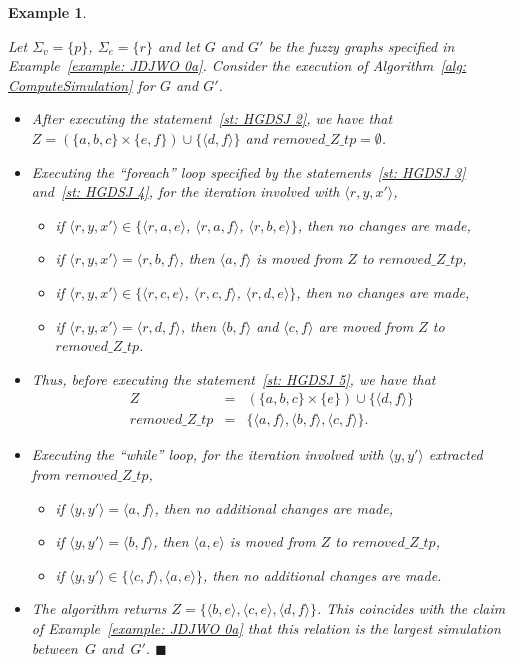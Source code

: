 \documentclass[11pt]{article}
\def\tuple#1{\langle#1\rangle}
\newcommand{\myend}{\mbox{}\hfill{\footnotesize$\blacksquare$}}
\newcommand{\SV}{\Sigma_v}
\newcommand{\SE}{\Sigma_e}
\newcommand{\removeZ}{\textit{removed\_Z\_tp}}
\newtheorem{Example}[theorem]{Example}
\newenvironment{example}{\begin{Example}\begin{em}}{\end{em}\end{Example}}
\begin{document}
\begin{example}\label{example: JDJWO}
Let $\SV = \{p\}$, $\SE = \{r\}$ and let $G$ and $G'$ be the fuzzy graphs specified in Example~\ref{example: JDJWO 0a}.
%
Consider the execution of Algorithm~\ref{alg: ComputeSimulation} for $G$ and $G'$.  
	\begin{itemize}
		\item After executing the statement~\ref{st: HGDSJ 2}, we have that $Z = (\{a,b,c\} \times \{e,f\}) \cup \{\tuple{d,f}\}$ and $\removeZ = \emptyset$.
		\item Executing the ``foreach'' loop specified by the statements~\ref{st: HGDSJ 3} and~\ref{st: HGDSJ 4}, for the iteration involved with $\tuple{r,y,x'}$, 
		\begin{itemize}
			\item if $\tuple{r,y,x'} \in \{\tuple{r,a,e}$, $\tuple{r,a,f}$, $\tuple{r,b,e}\}$, then no changes are made, 
			\item if $\tuple{r,y,x'} = \tuple{r,b,f}$, then $\tuple{a,f}$ is moved from $Z$ to $\removeZ$, 
			\item if $\tuple{r,y,x'} \in \{\tuple{r,c,e}$, $\tuple{r,c,f}$, $\tuple{r,d,e}\}$, then no changes are made, 
			\item if $\tuple{r,y,x'} = \tuple{r,d,f}$, then $\tuple{b,f}$ and $\tuple{c,f}$ are moved from $Z$ to $\removeZ$.   
		\end{itemize}
		\item Thus, before executing the statement~\ref{st: HGDSJ 5}, we have that 
		\begin{eqnarray*}
			Z & = & (\{a,b,c\} \times \{e\}) \cup \{\tuple{d,f}\} \\
			\removeZ & = & \{\tuple{a,f},\tuple{b,f},\tuple{c,f}\}.
		\end{eqnarray*}
		
		\item Executing the ``while'' loop, for the iteration involved with $\tuple{y,y'}$ extracted from $\removeZ$, 
		\begin{itemize}
			\item if $\tuple{y,y'} = \tuple{a,f}$, then no additional changes are made, 
			\item if $\tuple{y,y'} = \tuple{b,f}$, then $\tuple{a,e}$ is moved from $Z$ to $\removeZ$, 
			\item if $\tuple{y,y'} \in \{\tuple{c,f}, \tuple{a,e}\}$, then no additional changes are made.
		\end{itemize}
		\item The algorithm returns $Z = \{\tuple{b,e},\tuple{c,e},\tuple{d,f}\}$. 
		This coincides with the claim of Example~\ref{example: JDJWO 0a} that this relation is the largest simulation between~$G$ and~$G'$.  
		\myend
	\end{itemize}
\end{example}
\end{document}
